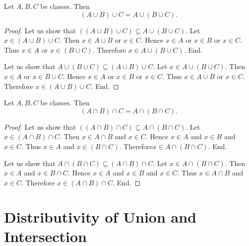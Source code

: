 \documentclass[10pt]{article}
\begin{document}
  \begin{forthel}
    \begin{proposition}
      Let $A, B, C$ be classes.
      Then \[ (A \cup B) \cup C = A \cup (B \cup C). \]
    \end{proposition}
    \begin{proof}
      Let us show that $((A \cup B) \cup C) \subseteq A \cup (B \cup C)$. %
        Let $x \in (A \cup B) \cup C$.
        Then $x \in A \cup B$ or $x \in C$.
        Hence $x \in A$ or $x \in B$ or $x \in C$.
        Thus $x \in A$ or $x \in (B \cup C)$.
        Therefore $x \in A \cup (B \cup C)$.
      End.

      Let us show that $A \cup (B \cup C) \subseteq (A \cup B) \cup C$.
        Let $x \in A \cup (B \cup C)$.
        Then $x \in A$ or $x \in B \cup C$.
        Hence $x \in A$ or $x \in B$ or $x \in C$.
        Thus $x \in A \cup B$ or $x \in C$.
        Therefore $x \in (A \cup B) \cup C$.
      End.
    \end{proof}
  \end{forthel}

  \begin{forthel}
    \begin{proposition}
      Let $A, B, C$ be classes.
      Then \[ (A \cap B) \cap C = A \cap (B \cap C). \]
    \end{proposition}
    \begin{proof}
      Let us show that $((A \cap B) \cap C) \subseteq A \cap (B \cap C)$. %
        Let $x \in (A \cap B) \cap C$.
        Then $x \in A \cap B$ and $x \in C$.
        Hence $x \in A$ and $x \in B$ and $x \in C$.
        Thus $x \in A$ and $x \in (B \cap C)$.
        Therefore$ x \in A \cap (B \cap C)$.
      End.

      Let us show that $A \cap (B \cap C) \subseteq (A \cap B) \cap C$.
        Let $x \in A \cap (B \cap C)$.
        Then $x \in A$ and $x \in B \cap C$.
        Hence $x \in A$ and $x \in B$ and $x \in C$.
        Thus $x \in A \cap B$ and $x \in C$.
        Therefore $x \in (A \cap B) \cap C$.
      End.
    \end{proof}
  \end{forthel}


  \section{Distributivity of Union and Intersection}
\end{document}
